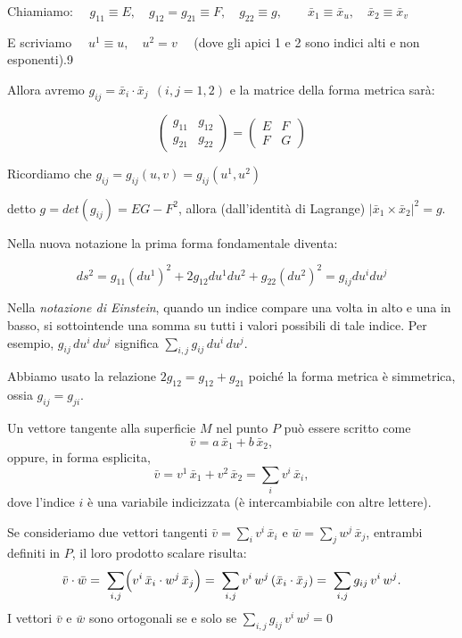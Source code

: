 Chiamiamo: $\quad
g_{11} \equiv E, \quad g_{12} = g_{21} \equiv F, \quad g_{22} \equiv g, \qquad \bar x_1 \equiv \bar x_u, \quad \bar x_2 \equiv \bar x_v
$

E scriviamo $\quad u^1 \equiv u, \quad u^2 = v \quad$ (dove gli apici 1 e 2 sono indici alti e non esponenti).9

Allora avremo $g_{ij} = \bar x_i \cdot \bar x_j \ \ (i,j = 1,2)$ e la matrice della forma metrica sarà:

$$
\begin{pmatrix} g_{11} & g_{12} \\ g_{21} & g_{22} \end{pmatrix} = \begin{pmatrix} E & F \\ F & G \end{pmatrix}
$$

Ricordiamo che $g_{ij} = g_{ij}(u, v) = g_{ij}(u^1, u^2)$

detto $g = det(g_{ij}) = EG - F^2$, allora (dall'identità di Lagrange) $|\bar x_1 \times \bar x_2|^2 = g$.

Nella nuova notazione la prima forma fondamentale diventa:

$$
ds^2 = g_{11} (du^1)^2 + 2g_{12} du^1 du^2 + g_{22} (du^2)^2 = g_{ij} du^i du^j
$$

\begin{tipsblock}
Nella \emph{notazione di Einstein}, quando un indice compare una volta in alto e una in basso, si sottointende una somma su tutti i valori possibili di tale indice. Per esempio, $g_{ij}\,du^i\,du^j$ significa $\sum_{i,j} g_{ij}\,du^i\,du^j$.
\end{tipsblock}

Abbiamo usato la relazione $2g_{12} = g_{12} + g_{21}$ poiché la forma metrica è simmetrica, ossia $g_{ij} = g_{ji}$.

Un vettore tangente alla superficie $M$ nel punto $P$ può essere scritto come
$$
\bar v = a\,\bar x_1 + b\,\bar x_2,
$$
oppure, in forma esplicita,
$$
\bar v = v^1\,\bar x_1 + v^2\,\bar x_2 = \sum_{i} v^i\,\bar x_i,
$$
dove l'indice $i$ è una variabile indicizzata (è intercambiabile con altre lettere).

Se consideriamo due vettori tangenti $\bar v = \sum_{i} v^i\,\bar x_i$ e $\bar w = \sum_{j} w^j\,\bar x_j$, entrambi definiti in $P$, il loro prodotto scalare risulta:
$$
\bar v \cdot \bar w 
=\; \sum_{i,j} \Bigl( v^i\,\bar x_i \cdot w^j\,\bar x_j \Bigr)
=\; \sum_{i,j} v^i\,w^j\,(\bar x_i \cdot \bar x_j)
=\; \sum_{i,j} g_{ij}\,v^i\,w^j.
$$
I vettori $\bar v$ e $\bar w$ sono ortogonali se e solo se $\sum_{i,j} g_{ij}\,v^i\,w^j = 0$

